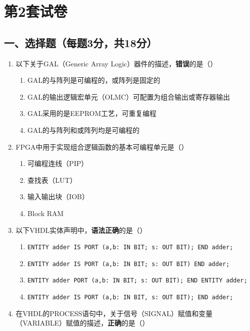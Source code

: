 \chapter{第2套试卷}

\section{一、选择题（每题3分，共18分）}

\begin{enumerate}[label=\arabic*.]

\item 以下关于GAL（Generic Array Logic）器件的描述，\textbf{错误}的是（\quad）

\begin{enumerate}[label=(\Alph*)]
\item GAL的与阵列是可编程的，或阵列是固定的
\item GAL的输出逻辑宏单元（OLMC）可配置为组合输出或寄存器输出
\item GAL采用的是EEPROM工艺，可重复编程
\item GAL的与阵列和或阵列均是可编程的
\end{enumerate}

\item FPGA中用于实现组合逻辑函数的基本可编程单元是（\quad）

\begin{enumerate}[label=(\Alph*)]
\item 可编程连线（PIP）
\item 查找表（LUT）
\item 输入输出块（IOB）
\item Block RAM
\end{enumerate}

\item 以下VHDL实体声明中，\textbf{语法正确}的是（\quad）

\begin{enumerate}[label=(\Alph*)]
\item \texttt{ENTITY adder IS PORT (a,b: IN BIT; s: OUT BIT); END adder;}
\item \texttt{ENTITY adder IS PORT (a,b: IN BIT; s: OUT BIT) END adder;}
\item \texttt{ENTITY adder PORT (a,b: IN BIT; s: OUT BIT); END ENTITY adder;}
\item \texttt{ENTITY adder IS PORT (a,b: IN BIT, s: OUT BIT); END adder;}
\end{enumerate}

\item 在VHDL的PROCESS语句中，关于信号（SIGNAL）赋值和变量（VARIABLE）赋值的描述，\textbf{正确}的是（\quad）


\end{enumerate}

